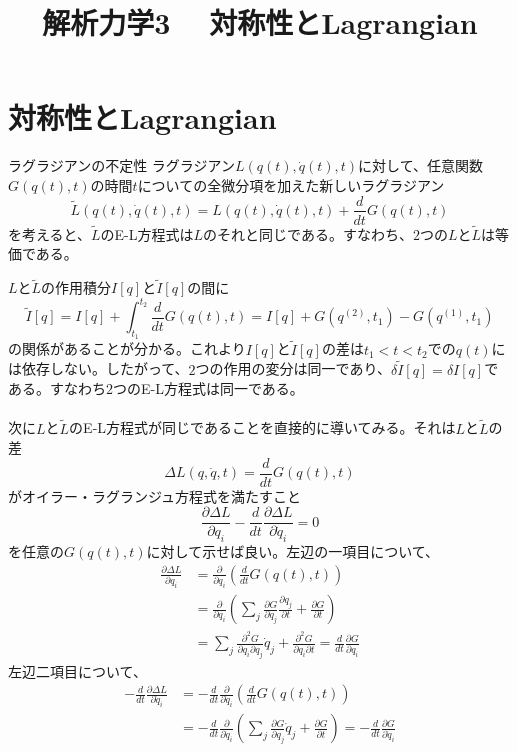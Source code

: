 \documentclass{jsarticle}
\title{解析力学3 　対称性とLagrangian}
\author{}
\date{}
\begin{document}
\maketitle
\noindent
\section{対称性とLagrangian}
\noindent
\begin{itembox}[l]{ラグラジアンの不定性}
ラグラジアン\(L(q(t),\dot{q}(t),t)\)に対して、任意関数\(G(q(t),t)\)の時間\(t\)についての全微分項を加えた新しいラグラジアン
\[\widetilde{L}(q(t),\dot{q}(t),t)=L(q(t),\dot{q}(t),t)+\frac{d}{dt}G(q(t),t)\]
を考えると、\(\widetilde{L}\)のE-L方程式は\(L\)のそれと同じである。すなわち、\(2\)つの\(L\)と\(\widetilde{L}\)は等価である。
\end{itembox}
\(L\)と\(\widetilde{L}\)の作用積分\(I[q]\)と\(\widetilde{I}[q]\)の間に
\[\widetilde{I}[q]=I[q]+\int_{t_{1}}^{t_{2}}\frac{d}{dt}G(q(t),t)=I[q]+G(q^{(2)},t_{1})-G(q^{(1)},t_{1})\]
の関係があることが分かる。これより\(I[q]\)と\(\widetilde{I}[q]\)の差は\(t_{1}<t<t_{2}\)での\(q(t)\)には依存しない。したがって、\(2\)つの作用の変分は同一であり、\(\delta\widetilde{I}[q]=\delta I[q]\)である。すなわち\(2\)つのE-L方程式は同一である。\\
\\
次に\(L\)と\(\widetilde{L}\)のE-L方程式が同じであることを直接的に導いてみる。それは\(L\)と\(\widetilde{L}\)の差
\[\Delta L(q,\dot{q},t)=\frac{d}{dt}G(q(t),t)\]
がオイラー・ラグランジュ方程式を満たすこと
\[\frac{\partial\Delta L}{\partial q_{i}}-\frac{d}{dt}\frac{\partial\Delta L}{\partial\dot{q}_{i}}=0\]
を任意の\(G(q(t),t)\)に対して示せば良い。左辺の一項目について、
\begin{align*}
\frac{\partial\Delta L}{\partial q_{i}}&=\frac{\partial}{\partial q_{i}}\left(\frac{d}{dt}G(q(t),t)\right)\\
&=\frac{\partial}{\partial q_{i}}\left(\sum_{j}\frac{\partial G}{\partial q_{j}}\frac{\partial q_{j}}{\partial t}+\frac{\partial G}{\partial t}\right)\\
&=\sum_{j}\frac{\partial^{2}G}{\partial q_{i}\partial q_{j}}\dot{q}_{j}+\frac{\partial^{2}G}{\partial q_{i}\partial t}=\frac{d}{dt}\frac{\partial G}{\partial q_{i}}
\end{align*}
左辺二項目について、
\begin{align*}
-\frac{d}{dt}\frac{\partial\Delta L}{\partial\dot{q}_{i}}&=-\frac{d}{dt}\frac{\partial}{\partial\dot{q}_{i}}\left(\frac{d}{dt}G(q(t),t)\right)\\
&=-\frac{d}{dt}\frac{\partial}{\partial\dot{q}_{i}}\left(\sum_{j}\frac{\partial G}{\partial q_{j}}\dot{q}_{j}+\frac{\partial G}{\partial t}\right)=-\frac{d}{dt}\frac{\partial G}{\partial\dot{q}_{i}}
\end{align*}
\end{document}

